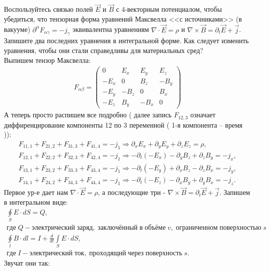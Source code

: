 \documentclass[__main__.tex]{subfiles}
\begin{document}
Воспользуйтесь связью полей $\vec{E}$ и $\vec{B}$ с 4-векторным потенциалом, чтобы убедиться, что тензорная форма уравнений Максвелла <<с источниками>> (в вакууме) $\partial^{\alpha}F_{\alpha\gamma}=-j_{\gamma}$ эквивалентна уравнениям $\nabla\cdot\vec{E}=\rho$ и $\nabla\times\vec{B}=\partial_{t}\vec{E}+\vec{j}$. Запишите два последних уравнения в интегральной форме. Как следует изменить уравнения, чтобы они стали справедливы для материальных сред?\\

Выпишем тензор Максвелла:
\begin{gather*}
    F_{\alpha\beta}=
    \begin{pmatrix}
        0    & E_x  & E_y  & E_z  \\
        -E_x & 0    & B_z  & -B_y \\
        -E_y & -B_z & 0    & B_x  \\
        -E_z & B_y  & -B_x & 0
    \end{pmatrix}
\end{gather*}
А теперь просто распишем все подробно ( далее запись $F_{12,3}$ означает диффиренцирование компоненты 12 по 3 переменной ( 1-я компонента -- время )):
\begin{gather*}
    F_{11,1}+F_{21,2}+F_{31,3}+F_{41,4} = -j_1 \Rightarrow \partial_x E_x+\partial_y E_y+\partial_z E_z = \rho,\\
    F_{12,1}+F_{22,2}+F_{32,3}+F_{42,4} = -j_1 \Rightarrow -\partial_t(-E_x)-\partial_y B_z+\partial_z B_y = -j_x,\\
    F_{13,1}+F_{23,2}+F_{33,3}+F_{43,4} = -j_1 \Rightarrow -\partial_t(-E_y)+\partial_x B_z-\partial_z B_x = -j_y,\\
    F_{14,1}+F_{24,2}+F_{34,3}+F_{44,4} = -j_1 \Rightarrow -\partial_t(-E_z)-\partial_x B_y+\partial_y B_x = -j_z.
\end{gather*}
Первое ур-е дает нам $\nabla\cdot\vec E = \rho$, а последующие три - $\nabla\times\vec B = \partial_{t}\vec E + \vec j$. Запишем в интегральном виде:
\begin{gather*}
    \oint\limits_S E\cdot dS = Q,\\ где\;Q - электрический\; заряд, \;заключённый \;в\; объёме \;v,\; ограниченном\; поверхностью \;s\\
    \oint\limits_l B\cdot dl = I + \frac{d}{dt}\int\limits_S E\cdot dS,\\ где\; I -  электрический\; ток,\; проходящий\; через\; поверхность\; s.
\end{gather*}
Звучат они так:
\end{document}
